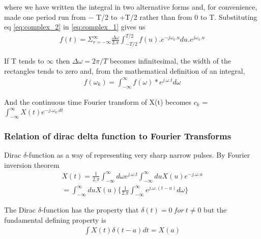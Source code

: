 \documentclass{article}
\begin{document}
where we have written the integral in two alternative forms and, for convenience, made one period run from − T/2 to +T/2 rather than from 0 to T. Substituting eq \eqref{eq:complex_2} in \eqref{eq:complex_1} gives us 
\begin{equation}
\begin{aligned}
     f(t) = \Sigma_{r = -\infty}^{\infty} \frac{\Delta\omega}{2.\pi} \int_{-T/2}^{T/2} f(u).e^{-j\omega_k.u} du . e^{j\omega_k.u} 
\end{aligned}
\label{eq:complex_3}
\end{equation}

If T tends to $\infty$ then $\Delta \omega = 2π/T $ becomes infinitesimal, the width of the rectangles tends to zero and, from the mathematical definition of an integral,
\begin{equation}
\begin{aligned}
     f(\omega_k) = \int_{-\infty}^{\infty} f(\omega)*e^{j.\omega.t} d\omega
\end{aligned}
\label{eq:complex_4}
\end{equation}

And the continuous time Fourier transform of X(t) becomes 
$c_k$ = $\int_{-\infty}^{\infty} X(t) e^{-j.\omega_k . dt}$

\subsubsection{Relation of dirac delta function to Fourier Transforms}
Dirac $\delta$-function as a way of representing
very sharp narrow pulses. By Fourier inversion theorem
\begin{equation}
\begin{aligned}
     X(t) = \frac{1}{2.\pi} \int_{-\infty}^{\infty} d\omega e^{j.\omega.t} \int_{-\infty}^{\infty} du X(u) e^{-j.\omega.u} \\
     
     = \int_{-\infty}^{\infty} du X(u) \{ \frac{1}{2.\pi} \int_{-\infty}^{\infty} e^{j.\omega.(t-u) } d\omega \}
\end{aligned}
\label{eq:complex_5}
\end{equation}

The Dirac $\delta$-function has the property that $\delta(t) = 0 \ for \ t \neq 0$
but the fundamental defining property is 
\begin{equation}
\begin{aligned}
     \int X(t)\delta(t-a) dt = X(a)
\end{aligned}
\label{eq:dirac_property}
\end{equation}
\end{document}
